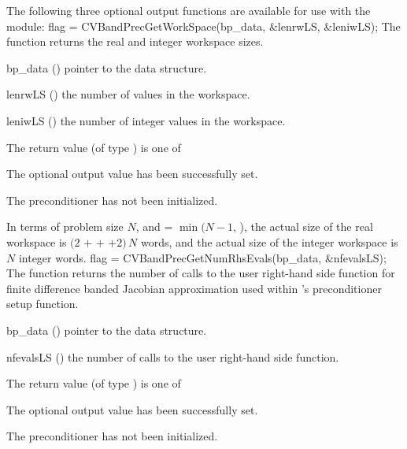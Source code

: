 The following three optional output functions are available for use with 
the {\cvbandpre} module:
{
  flag = CVBandPrecGetWorkSpace(bp\_data, \&lenrwLS, \&leniwLS);
}
{
  The function  returns the
  {\cvbandpre} real and integer workspace sizes.
}
{
  \begin{args}[lenrwLS]
  \item[bp\_data] ()
    pointer to the {\cvbandpre} data structure.
  \item[lenrwLS] ()
    the number of  values in the {\cvbandpre} workspace.
  \item[leniwLS] ()
    the number of integer values in the {\cvbandpre} workspace.
  \end{args}
}
{
  The return value  (of type ) is one of
  \begin{args}
  \item[\Id{CV\_SUCCESS}] 
    The optional output value has been successfully set.
  \item[\Id{CV\_PDATA\_NULL}]
    The {\cvbandpre} preconditioner has not been initialized.
  \end{args}
}
{
  In terms of problem size $N$, and  = $\min(N-1,\,$),
  the actual size of the real workspace is
  $(2$  $+$  $+$  $+2)\, N$  words,
  and the actual size of the integer workspace is $N$ integer words.
}
{
  flag = CVBandPrecGetNumRhsEvals(bp\_data, \&nfevalsLS);
}
{
  The function  returns the
  number of calls to the user right-hand side function for
  finite difference banded Jacobian approximation used within
  {\cvbandpre}'s preconditioner setup function.
}
{
  \begin{args}[nfevalsLS]
  \item[bp\_data] ()
    pointer to the {\cvbandpre} data structure.
  \item[nfevalsLS] ()
    the number of calls to the user right-hand side function.
  \end{args}
}
{
  The return value  (of type ) is one of
  \begin{args}
  \item[\Id{CV\_SUCCESS}] 
    The optional output value has been successfully set.
  \item[\Id{CV\_PDATA\_NULL}]
    The {\cvbandpre} preconditioner has not been initialized.
  \end{args}
}
{}

